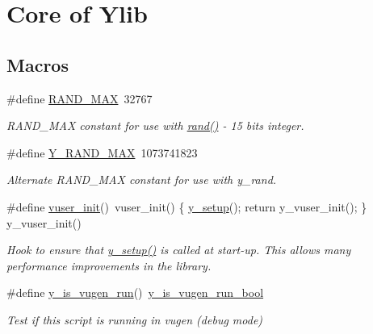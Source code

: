 \hypertarget{group__core}{\section{Core of Ylib}
\label{group__core}
}
\subsection*{Macros}
\begin{DoxyCompactItemize}
\item 
\#define \hyperlink{group__core_ga690f251553b39fd4f31894826141b61a}{R\-A\-N\-D\-\_\-\-M\-A\-X}~32767
\begin{DoxyCompactList}\small\item\em R\-A\-N\-D\-\_\-\-M\-A\-X constant for use with \hyperlink{vugen_8h_ae23144bcbb8e3742b00eb687c36654d1}{rand()} -\/ 15 bits integer. \end{DoxyCompactList}\item 
\#define \hyperlink{group__core_ga16db77ab873c5b767742a51c9613314b}{Y\-\_\-\-R\-A\-N\-D\-\_\-\-M\-A\-X}~1073741823
\begin{DoxyCompactList}\small\item\em Alternate R\-A\-N\-D\-\_\-\-M\-A\-X constant for use with y\-\_\-rand. \end{DoxyCompactList}\item 
\hypertarget{group__core_ga2af77582aacd5cada48e9860f67d67e1}{\#define \hyperlink{group__core_ga2af77582aacd5cada48e9860f67d67e1}{vuser\-\_\-init}()~vuser\-\_\-init() \{ \hyperlink{group__core_ga7350ca6bb0383b2169ef4eaae3b091e7}{y\-\_\-setup}(); return y\-\_\-vuser\-\_\-init(); \} y\-\_\-vuser\-\_\-init()}\label{group__core_ga2af77582aacd5cada48e9860f67d67e1}

\begin{DoxyCompactList}\small\item\em Hook to ensure that \hyperlink{group__core_ga7350ca6bb0383b2169ef4eaae3b091e7}{y\-\_\-setup()} is called at start-\/up. This allows many performance improvements in the library. \end{DoxyCompactList}\item 
\#define \hyperlink{group__core_gaed34897cb0a5fb0ae18cf0d6facc35b5}{y\-\_\-is\-\_\-vugen\-\_\-run}()~\hyperlink{group__core_ga6946e1e353167a7a711e3ddcb8a39b6d}{y\-\_\-is\-\_\-vugen\-\_\-run\-\_\-bool}
\begin{DoxyCompactList}\small\item\em Test if this script is running in vugen (debug mode) \end{DoxyCompactList}\end{DoxyCompactItemize}
